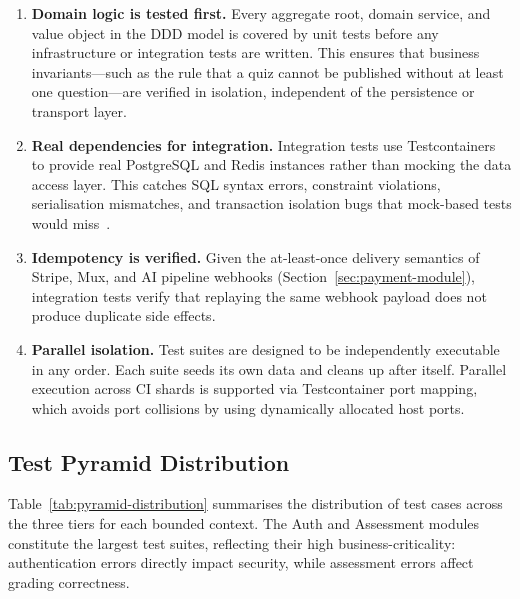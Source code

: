 \begin{enumerate}
  \item \textbf{Domain logic is tested first.} Every aggregate root, domain service, and value object in the DDD model is covered by unit tests before any infrastructure or integration tests are written. This ensures that business invariants---such as the rule that a quiz cannot be published without at least one question---are verified in isolation, independent of the persistence or transport layer.
  \item \textbf{Real dependencies for integration.} Integration tests use Testcontainers to provide real PostgreSQL and Redis instances rather than mocking the data access layer. This catches SQL syntax errors, constraint violations, serialisation mismatches, and transaction isolation bugs that mock-based tests would miss~\cite{testcontainers2024}.
  \item \textbf{Idempotency is verified.} Given the at-least-once delivery semantics of Stripe, Mux, and AI pipeline webhooks (Section~\ref{sec:payment-module}), integration tests verify that replaying the same webhook payload does not produce duplicate side effects.
  \item \textbf{Parallel isolation.} Test suites are designed to be independently executable in any order. Each suite seeds its own data and cleans up after itself. Parallel execution across CI shards is supported via Testcontainer port mapping, which avoids port collisions by using dynamically allocated host ports.
\end{enumerate}

\subsection{Test Pyramid Distribution}

Table~\ref{tab:pyramid-distribution} summarises the distribution of test cases across the three tiers for each bounded context. The Auth and Assessment modules constitute the largest test suites, reflecting their high business-criticality: authentication errors directly impact security, while assessment errors affect grading correctness.

